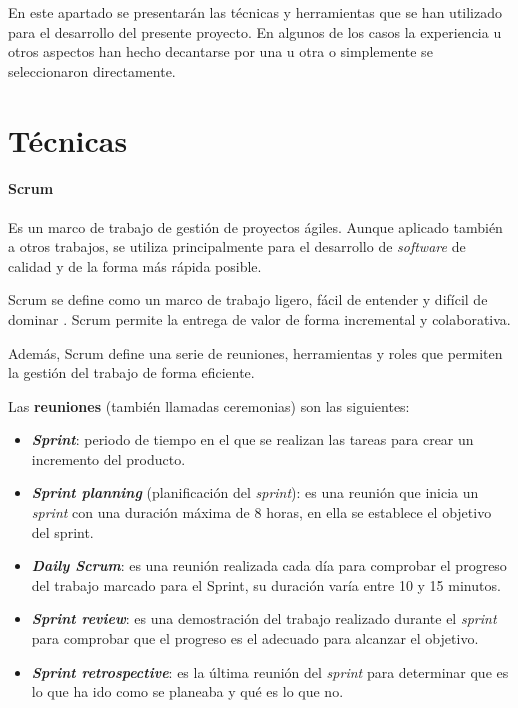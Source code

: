 
En este apartado se presentarán las técnicas y herramientas que se han utilizado
para el desarrollo del presente proyecto. En algunos de los casos la experiencia
u otros aspectos han hecho decantarse por una u otra o simplemente se
seleccionaron directamente.

\section{Técnicas}


\paragraph{Scrum} Es un marco de trabajo de gestión de proyectos ágiles. Aunque aplicado
también a otros trabajos, se utiliza principalmente para el desarrollo de
\textit{software} de calidad y de la forma más rápida posible.

Scrum se define como un marco de trabajo ligero, fácil de entender y difícil de
dominar \cite{scrum}. Scrum permite la entrega de valor de forma incremental y
colaborativa.

Además, Scrum define una serie de reuniones, herramientas y roles que permiten
la gestión del trabajo de forma eficiente.

Las \textbf{reuniones} (también llamadas ceremonias) son las siguientes:
\begin{itemize}
    \item \textbf{\textit{Sprint}}: periodo de tiempo en el que se realizan las
    tareas para crear un incremento del producto.
    \item \textbf{\textit{Sprint planning}} (planificación del \emph{sprint}):
    es una reunión que inicia un \emph{sprint} con una duración máxima de 8
    horas, en ella se establece el objetivo del sprint.
    \item \textbf{\textit{Daily Scrum}}: es una reunión realizada cada día para
    comprobar el progreso del trabajo marcado para el Sprint, su duración varía
    entre 10 y 15 minutos.
    \item \textbf{\textit{Sprint review}}: es una demostración del trabajo
    realizado durante el \emph{sprint} para comprobar que el progreso es el
    adecuado para alcanzar el objetivo.
    \item \textbf{\textit{Sprint retrospective}}: es la última reunión del
    \emph{sprint} para determinar que es lo que ha ido como se planeaba y qué es
    lo que no.
\end{itemize}

